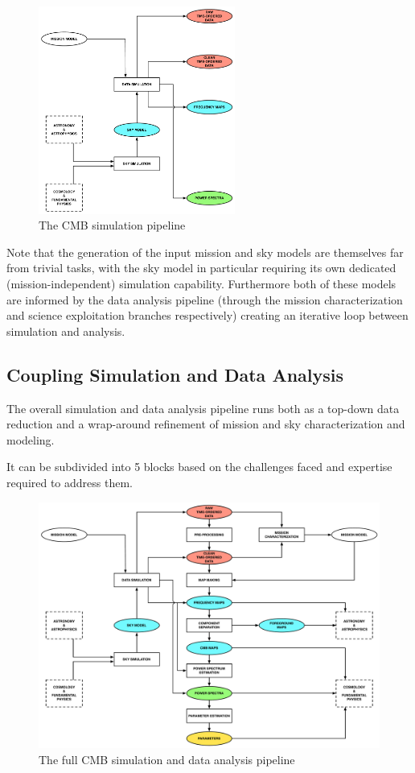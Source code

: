 \begin{figure}[htbp]
\includegraphics[width=0.575\textwidth]{Analysis/sim}
\caption{The CMB simulation pipeline}
\label{fig_sim}
\end{figure}

Note that the generation of the input mission and sky models are themselves far from trivial tasks, with the sky model in particular requiring its own dedicated (mission-independent) simulation capability. Furthermore both of these models are informed by the data analysis pipeline (through the mission characterization and science exploitation branches respectively) creating an iterative loop between simulation and analysis.

\newpage

\subsection{Coupling Simulation and Data Analysis}

The overall simulation and data analysis pipeline runs both as a top-down data reduction and a wrap-around refinement of mission and sky characterization and modeling.

It can be subdivided into 5 blocks based on the challenges faced and expertise required to address them.

\begin{figure}[htbp]
\centering
\includegraphics[width=1\textwidth]{Analysis/simda}
\caption{The full CMB simulation and data analysis pipeline}
\label{default}

\end{figure}

